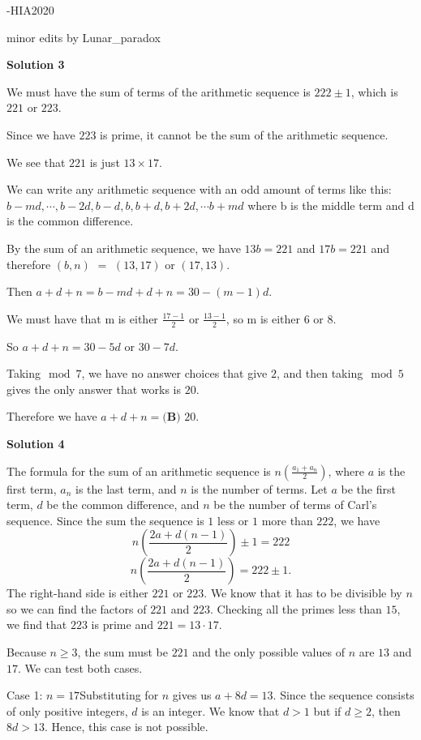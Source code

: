 \begin{enumerate}
 -HIA2020

 minor edits by Lunar\_paradox

 



\textbf{Solution 3}

We must have the sum of terms of the arithmetic sequence is $222\pm 1$, which is $221$ or $223$.

 Since we have $223$ is prime, it cannot be the sum of the arithmetic sequence.

 We see that $221$ is just $13\times 17$.

 We can write any arithmetic sequence with an odd amount of terms like this:$b-md,\cdots ,b-2d,b-d,b,b+d,b+2d,\cdots b+md$ where b is the middle term and d is the common difference.

 By the sum of an arithmetic sequence, we have $13b=221$ and $17b=221$ and therefore $(b,n)$ $=$ $(13,17)$ or $(17,13)$.

 Then $a+d+n=b-md+d+n=30-(m-1)d$.

 We must have that m is either $\frac{17-1}{2}$ or $\frac{13-1}{2}$, so m is either $6$ or $8$.

 So $a+d+n=30-5d$ or $30-7d$.

 Taking$\mod 7$, we have no answer choices that give $2$, and then taking$\mod 5$ gives the only answer that works is $20$.

 Therefore we have $a+d+n=\boxed{\textbf{(B) }20.}$




\textbf{Solution 4}

The formula for the sum of an arithmetic sequence is $n(\frac{a_1+a_n}{2})$, where $a$ is the first term, $a_n$ is the last term, and $n$ is the number of terms. Let $a$ be the first term, $d$ be the common difference, and $n$ be the number of terms of Carl's sequence. Since the sum the sequence is $1$ less or $1$ more than $222$, we have
 \[n(\frac{2a+d(n-1)}{2})\pm{1} = 222\]
 \[n(\frac{2a+d(n-1)}{2}) = 222\pm{1}.\]The right-hand side is either $221$ or $223$. We know that it has to be divisible by $n$ so we can find the factors of $221$ and $223$. Checking all the primes less than $15$, we find that $223$ is prime and $221=13\cdot17$. 

 Because $n\ge3$, the sum must be $221$ and the only possible values of $n$ are $13$ and $17$. We can test both cases. 

 
Case 1: $n=17$Substituting for $n$ gives us $a+8d=13$. Since the sequence consists of only positive integers, $d$ is an integer. We know that $d>1$ but if $d\ge2$, then $8d>13$. Hence, this case is not possible. 


\end{enumerate}
